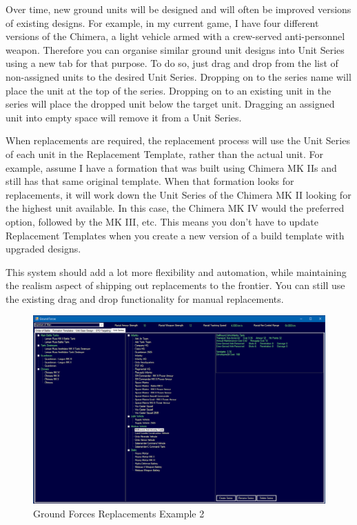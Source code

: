 \documentclass[../../Aurora C# unofficial manual.tex]{subfiles}
\begin{document}
	Over time, new ground units will be designed and will often be improved versions of existing designs. For example, in my current game, I have four different versions of the Chimera, a light vehicle armed with a crew-served anti-personnel weapon. Therefore you can organise similar ground unit designs into Unit Series using a new tab for that purpose. To do so, just drag and drop from the list of non-assigned units to the desired Unit Series. Dropping on to the series name will place the unit at the top of the series. Dropping on to an existing unit in the series will place the dropped unit below the target unit. Dragging an assigned unit into empty space will remove it from a Unit Series.
	
	When replacements are required, the replacement process will use the Unit Series of each unit in the Replacement Template, rather than the actual unit. For example, assume I have a formation that was built using Chimera MK IIs and still has that same original template. When that formation looks for replacements, it will work down the Unit Series of the Chimera MK II looking for the highest unit available. In this case, the Chimera MK IV would the preferred option, followed by the MK III, etc. This means you don't have to update Replacement Templates when you create a new version of a build template with upgraded designs.
	
	This system should add a lot more flexibility and automation, while maintaining the realism aspect of shipping out replacements to the frontier. You can still use the existing drag and drop functionality for manual replacements.
	\begin{figure}[H]
		\centering
		\includegraphics[width=0.95\linewidth]{images/Replacements2}
		\caption[Replacements]{Ground Forces Replacements Example 2}
		\label{fig:replacements2}
	\end{figure}
\end{document}

